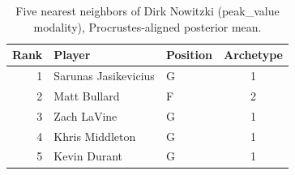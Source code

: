 \begin{table}[htbp]
  \centering\small
  \begin{tabular}{rllc}
    \toprule
    Rank & Player & Position & Archetype \\
    \midrule
    1 & Sarunas Jasikevicius & G & 1 \\
    2 & Matt Bullard & F & 2 \\
    3 & Zach LaVine & G & 1 \\
    4 & Khris Middleton & G & 1 \\
    5 & Kevin Durant & G & 1 \\
    \bottomrule
  \end{tabular}
  \caption{Five nearest neighbors of Dirk Nowitzki (peak_value modality), Procrustes-aligned posterior mean.}
  \label{tab:Dirk_Nowitzki_neighbors_peak_value}
\end{table}


